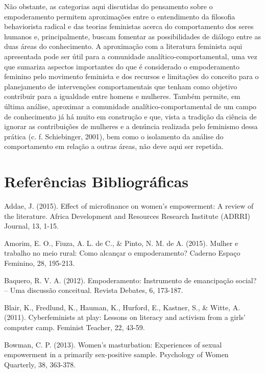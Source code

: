 Não obstante, as categorias aqui discutidas do pensamento sobre o empoderamento permitem aproximações entre o entendimento da filosofia behaviorista radical e das teorias feministas acerca do comportamento dos seres humanos e, principalmente, buscam fomentar as possibilidades de diálogo entre as duas áreas do conhecimento. A aproximação com a literatura feminista aqui apresentada pode ser útil para a comunidade analítico-comportamental, uma vez que sumariza aspectos importantes do que é considerado o empoderamento feminino pelo movimento feminista e dos recursos e limitações do conceito para o planejamento de intervenções comportamentais que tenham como objetivo contribuir para a igualdade entre homens e mulheres. Também permite, em última análise, aproximar a comunidade analítico-comportamental de um campo de conhecimento já há muito em construção e que, vista a tradição da ciência de ignorar as contribuições de mulheres e a denúncia realizada pelo feminismo dessa prática (c. f. Schiebinger, 2001), bem como o isolamento da análise do comportamento em relação a outras áreas, não deve aqui ser repetida.

\section*{Referências Bibliográficas}

\hangindent=25pt
\noindent Addae, J. (2015). Effect of microfinance on women's empowerment: A review of the literature. Africa Development and Resources Research Institute (ADRRI) Journal, 13, 1-15.

\hangindent=25pt
\noindent Amorim, E. O., Fiuza, A. L. de C., \& Pinto, N. M. de A. (2015). Mulher e trabalho no meio rural: Como alcançar o empoderamento? Caderno Espaço Feminino, 28, 195-213.

\hangindent=25pt
\noindent Baquero, R. V. A. (2012). Empoderamento: Instrumento de emancipação social? – Uma discussão conceitual. Revista Debates, 6, 173-187.

\hangindent=25pt
\noindent Blair, K., Fredlund, K., Hauman, K., Hurford, E., Kastner, S., \& Witte, A. (2011). Cyberfeminists at play: Lessons on literacy and activism from a girls’ computer camp. Feminist Teacher, 22, 43-59.

\hangindent=25pt
\noindent Bowman, C. P. (2013). Women’s masturbation: Experiences of sexual empowerment in a primarily sex-positive sample. Psychology of Women Quarterly, 38, 363-378.

